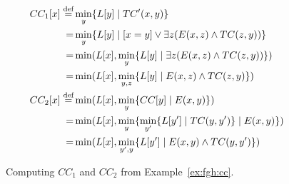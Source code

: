 \begin{figure}
  \begin{align*}
    CC_1[x]  \stackrel{\text{def}}{=} & \min_y \{{L[y]}\mid{TC'(x,y)}\}\\
    = & \min_y \{{L[y]}\mid{[x=y] \vee \exists z(E(x,z) \wedge TC(z,y))}\}\\
    = & \min(L[x], \min_y\{{L[y]}\mid{\exists z(E(x,z) \wedge TC(z,y))}\})\\
    = & \min(L[x], \min_{y,z}\{{L[y]}\mid{E(x,z) \wedge TC(z,y)}\})\\
    CC_2[x] \stackrel{\text{def}}{=} & \min(L[x], \min_y \{{CC[y]}\mid{E(x,y)}\}) \\
    =  & \min(L[x], \min_y \{{\min_{y'} \{{L[y']}\mid{TC(y,y')}\}}\mid{E(x,y)}\})\\
    = & \min(L[x], \min_{y',y}\{{L[y']}\mid{E(x,y) \wedge TC(y,y')}\})
  \end{align*}
  \caption{Computing $CC_1$ and $CC_2$ from Example~\ref{ex:fgh:cc}.}
  \label{fig:cc1:cc2}
\end{figure}

% 
% 



